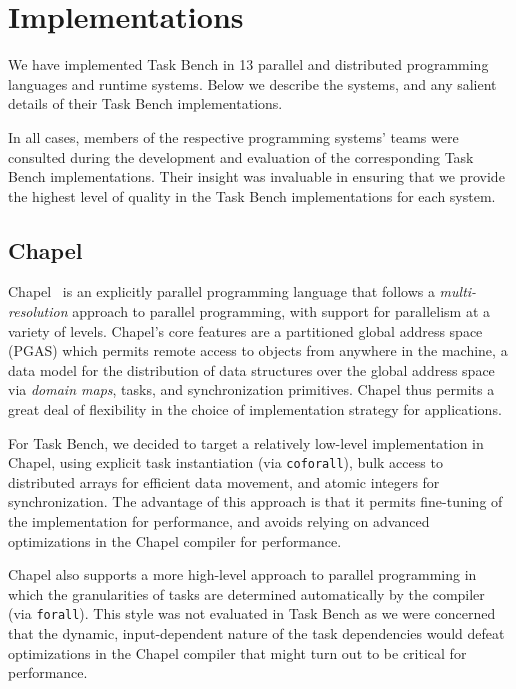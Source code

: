 \section{Implementations}
\label{sec:implementation}

We have implemented Task Bench in 13 parallel and distributed
programming languages and runtime systems. Below we describe the
systems, and any salient details of their Task Bench implementations.

In all cases, members of the respective programming systems' teams
were consulted during the development and evaluation of the
corresponding Task Bench implementations. Their insight was invaluable
in ensuring that we provide the highest level of quality in the Task
Bench implementations for each system.

\subsection{Chapel}

Chapel~\cite{Chapel07} is an explicitly parallel programming language
that follows a \emph{multi-resolution} approach to parallel
programming, with support for parallelism at a variety of
levels. Chapel's core features are a partitioned global address space
(PGAS) which permits remote access to objects from anywhere in the
machine, a data model for the distribution of data structures over the
global address space via \emph{domain maps}, tasks, and
synchronization primitives. Chapel thus permits a great deal of
flexibility in the choice of implementation strategy for applications.

For Task Bench, we decided to target a relatively low-level
implementation in Chapel, using explicit task instantiation (via
\lstinline[language=Chapel]{coforall}), bulk access to distributed
arrays for efficient data movement, and atomic integers for
synchronization. The advantage of this approach is that it permits
fine-tuning of the implementation for performance, and avoids relying
on advanced optimizations in the Chapel compiler for performance.

Chapel also supports a more high-level approach to parallel
programming in which the granularities of tasks are determined
automatically by the compiler (via
\lstinline[language=Chapel]{forall}). This style was not evaluated in
Task Bench as we were concerned that the dynamic, input-dependent
nature of the task dependencies would defeat optimizations in the
Chapel compiler that might turn out to be critical for performance.


